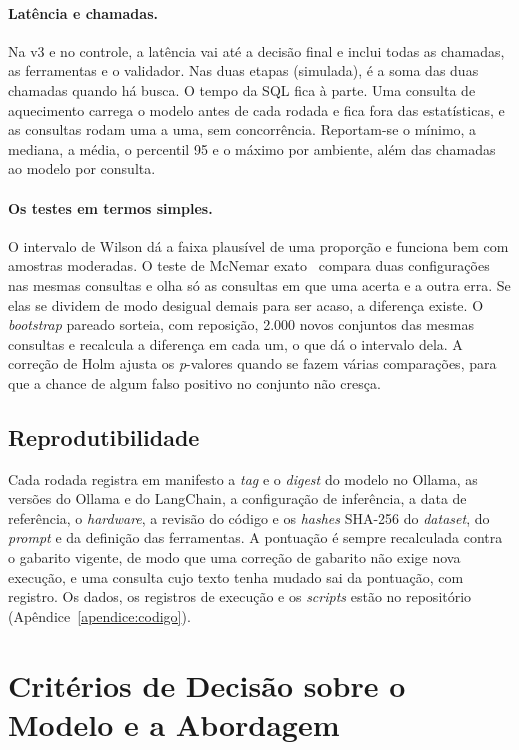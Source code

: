 \paragraph{Latência e chamadas.} Na v3 e no controle, a latência vai até a decisão final e inclui todas as chamadas, as ferramentas e o validador. Nas duas etapas (simulada), é a soma das duas chamadas quando há busca. O tempo da SQL fica à parte. Uma consulta de aquecimento carrega o modelo antes de cada rodada e fica fora das estatísticas, e as consultas rodam uma a uma, sem concorrência. Reportam-se o mínimo, a mediana, a média, o percentil 95 e o máximo por ambiente, além das chamadas ao modelo por consulta.

\paragraph{Os testes em termos simples.} O intervalo de Wilson dá a faixa plausível de uma proporção e funciona bem com amostras moderadas. O teste de McNemar exato~\cite{mcnemar1947note,dietterich1998approximate} compara duas configurações nas mesmas consultas e olha só as consultas em que uma acerta e a outra erra. Se elas se dividem de modo desigual demais para ser acaso, a diferença existe. O \textit{bootstrap} pareado sorteia, com reposição, 2.000 novos conjuntos das mesmas consultas e recalcula a diferença em cada um, o que dá o intervalo dela. A correção de Holm ajusta os \textit{p}-valores quando se fazem várias comparações, para que a chance de algum falso positivo no conjunto não cresça.

\subsection{Reprodutibilidade}
\label{sec:reprodutibilidade}

Cada rodada registra em manifesto a \textit{tag} e o \textit{digest} do modelo no Ollama, as versões do Ollama e do LangChain, a configuração de inferência, a data de referência, o \textit{hardware}, a revisão do código e os \textit{hashes} SHA-256 do \textit{dataset}, do \textit{prompt} e da definição das ferramentas. A pontuação é sempre recalculada contra o gabarito vigente, de modo que uma correção de gabarito não exige nova execução, e uma consulta cujo texto tenha mudado sai da pontuação, com registro. Os dados, os registros de execução e os \textit{scripts} estão no repositório (Apêndice~\ref{apendice:codigo}).

\section{Critérios de Decisão sobre o Modelo e a Abordagem}
\label{sec:criterios-decisao}

